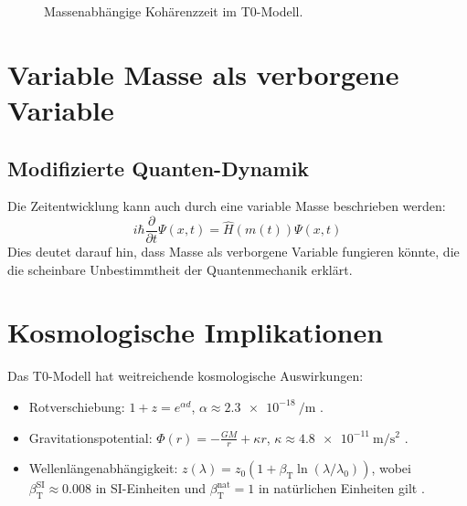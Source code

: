 \documentclass{article}
\newcommand{\betaT}{\beta_{\text{T}}}
\begin{document}
	\begin{figure}[h]
		\centering
		\caption{Massenabhängige Kohärenzzeit im T0-Modell.}
	\end{figure}
	
	\section{Variable Masse als verborgene Variable}
	\subsection{Modifizierte Quanten-Dynamik}
	Die Zeitentwicklung kann auch durch eine variable Masse beschrieben werden:
	\begin{equation}
		i\hbar \frac{\partial}{\partial t}\Psi(x,t) = \hat{H}(m(t))\Psi(x,t)
	\end{equation}
	Dies deutet darauf hin, dass Masse als verborgene Variable fungieren könnte, die die scheinbare Unbestimmtheit der Quantenmechanik erklärt.
	
	\section{Kosmologische Implikationen}
	Das T0-Modell hat weitreichende kosmologische Auswirkungen:
	\begin{itemize}
		\item Rotverschiebung: \( 1 + z = e^{\alpha d} \), \(\alpha \approx \SI{2.3e-18}{\per\meter}\) \cite{pascher_lagrange_2025}.
		\item Gravitationspotential: \(\Phi(r) = -\frac{G M}{r} + \kappa r\), \(\kappa \approx \SI{4.8e-11}{\meter\per\second\squared}\) \cite{pascher_lagrange_2025}.
		\item Wellenlängenabhängigkeit: \( z(\lambda) = z_0 (1 + \betaT \ln(\lambda/\lambda_0)) \), wobei \(\betaT^{\text{SI}} \approx 0.008\) in SI-Einheiten und \(\betaT^{\text{nat}} = 1\) in natürlichen Einheiten gilt \cite{pascher_params_2025}.
	\end{itemize}
	
\end{document}
